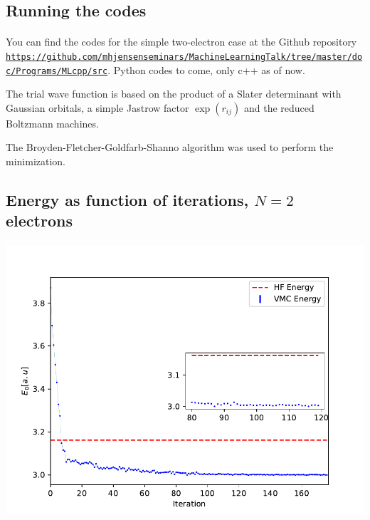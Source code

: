 \documentclass[%
oneside,                 %
final,                   %
10pt]{article}
\begin{document}
\subsection{Running the codes}

\paragraph{}
You can find the codes for the simple two-electron case at the Github repository \href{{https://github.com/mhjensenseminars/MachineLearningTalk/tree/master/doc/Programs/MLcpp/src}}{\nolinkurl{https://github.com/mhjensenseminars/MachineLearningTalk/tree/master/doc/Programs/MLcpp/src}}. Python codes to come, only c++ as of now. 

The trial wave function is based on the product of a Slater determinant with Gaussian orbitals, a simple Jastrow factor $\exp{(r_{ij})}$ and the reduced Boltzmann machines. 

The Broyden-Fletcher-Goldfarb-Shanno algorithm was used to perform the minimization.






\subsection{Energy as function of iterations, $N=2$ electrons}

\paragraph{}


\vspace{6mm}

\centerline{\includegraphics[width=0.9\linewidth]{figures/figN2.pdf}}
\end{document}
